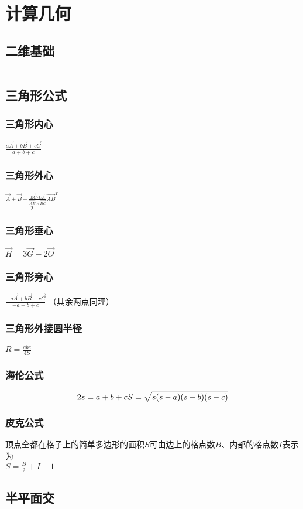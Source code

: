 \section{计算几何}
\subsection{二维基础}
\inputminted[breaklines]{cpp}{./computational_geometry/two_dimensions_basic.cpp}
\subsection{三角形公式}
\subsubsection{三角形内心}
$\frac{a \vec{A} + b \vec{B} + c \vec{C}}{a + b + c}$
\subsubsection{三角形外心}
$\frac{\vec{A} + \vec{B} - \frac{\vec{BC} \cdot \vec{CA}}{\vec{AB} \times \vec{BC}} \vec{AB}^T}{2}$
\subsubsection{三角形垂心}
$\vec{H} = 3 \vec{G} - 2 \vec{O}$
\subsubsection{三角形旁心}
$\frac{-a \vec{A} + b \vec{B} + c \vec{C}}{-a + b + c}$ （其余两点同理）
\subsubsection{三角形外接圆半径}
$R = \frac{abc}{4S}$
\subsubsection{海伦公式}
$$
2s = a + b + c \\
S = \sqrt{s(s - a)(s - b)(s - c)}
$$
\subsubsection{皮克公式}
顶点全都在格子上的简单多边形的面积$S$可由边上的格点数$B$、内部的格点数$I$表示为 \\
$S = \frac{B}{2} + I - 1$
\subsection{半平面交}
\inputminted[breaklines]{cpp}{./computational_geometry/half_plane_intersection.cpp}
